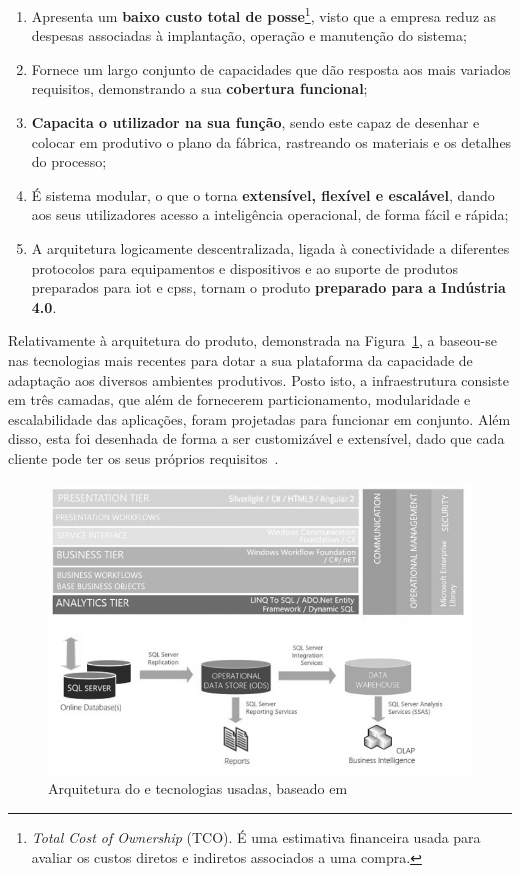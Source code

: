 \begin{enumerate}
    \item 
    {
        Apresenta um \textbf{baixo custo total de posse}\footnote{\textit{Total Cost of Ownership} (TCO). É uma estimativa financeira usada para avaliar os custos diretos e indiretos associados a uma compra.}, visto que a empresa reduz as despesas associadas à implantação, operação e manutenção do sistema;
    }
    \item
    {
        Fornece um largo conjunto de capacidades que dão resposta aos mais variados requisitos, demonstrando a sua \textbf{cobertura funcional};
    }
    \item
    {
        \textbf{Capacita o utilizador na sua função}, sendo este capaz de desenhar e colocar em produtivo o plano da fábrica, rastreando os materiais e os detalhes do processo;
    }
    \item
    {
        É sistema modular, o que o torna \textbf{extensível, flexível e escalável}, dando aos seus utilizadores acesso a inteligência operacional, de forma fácil e rápida; 
    }
    \item
    {
        A arquitetura logicamente descentralizada, ligada à conectividade a diferentes protocolos para equipamentos e dispositivos e ao suporte de produtos preparados para \gls{iot} e \glspl{cps}, tornam o produto \textbf{preparado para a Indústria 4.0}.
    }
\end{enumerate}

Relativamente à arquitetura do produto, demonstrada na Figura~\ref{fig:mes_framework}, a {\companyname} baseou-se nas tecnologias mais
recentes para dotar a sua plataforma da capacidade de adaptação aos diversos ambientes produtivos. Posto isto, a infraestrutura consiste em três camadas, que além de fornecerem particionamento, modularidade e escalabilidade das aplicações, foram projetadas para funcionar em conjunto. Além disso, esta foi desenhada de forma a ser customizável e extensível, dado que cada cliente pode ter os seus próprios requisitos~\parencite{cmf_mes_framework}.

\begin{figure}[!ht]
    \centering
    \includegraphics[width=.9\textwidth]{ch02/assets/mes_framework.jpg}
    \caption{Arquitetura do {\productname} e tecnologias usadas, baseado em~\textcite{cmf_mes_framework}}
    \label{fig:mes_framework}
\end{figure}

